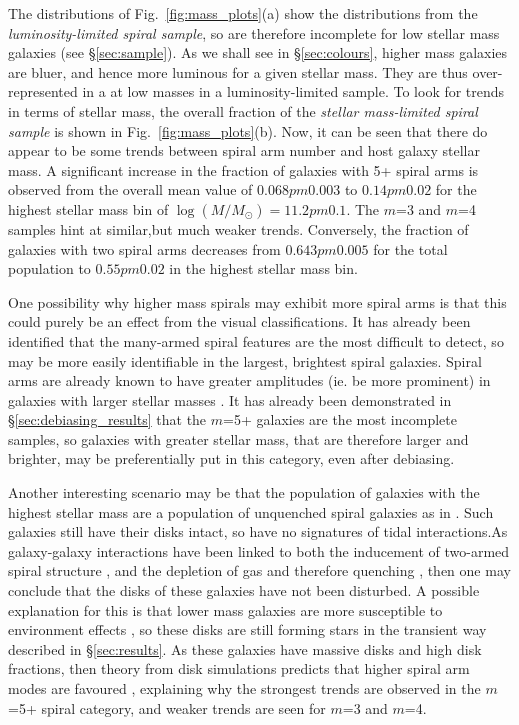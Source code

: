 \documentclass[useAMS,usenatbib]{mn2e}
\begin{document}
The distributions of Fig.~\ref{fig:mass_plots}(a) show the distributions from the \textit{luminosity-limited spiral sample}, so are therefore incomplete for low stellar mass galaxies (see \S\ref{sec:sample}). As we shall see in \S\ref{sec:colours}, higher mass galaxies are bluer, and hence more luminous for a given stellar mass. They are thus over-represented in a at low masses in a luminosity-limited sample. To look for trends in terms of stellar mass, the overall fraction of the \textit{stellar mass-limited spiral sample} is shown in Fig.~\ref{fig:mass_plots}(b). Now, it can be seen that there do appear to be some trends between spiral arm number and host galaxy stellar mass. A significant increase in the fraction of galaxies with 5+ spiral arms is observed from the overall mean value of $0.068 pm 0.003$ to $0.14 pm 0.02$ for the highest stellar mass bin of $\log(M/M_{\odot}) = 11.2 pm 0.1$. The $m$=3 and $m$=4 samples hint at similar,but much weaker trends. Conversely, the fraction of galaxies with two spiral arms decreases from $0.643 pm 0.005$ for the total population to $0.55 pm 0.02$ in the highest stellar mass bin. 

One possibility why higher mass spirals may exhibit more spiral arms is that this could purely be an effect from the visual classifications. It has already been  identified that the many-armed spiral features are the most difficult to detect, so  may be more easily identifiable in the largest, brightest spiral galaxies. Spiral arms are already known to have greater amplitudes (ie. be more prominent) in galaxies with larger stellar masses \citep{Kendall_15}. It has already been demonstrated in \S\ref{sec:debiasing_results} that the $m$=5+ galaxies are the most incomplete samples, so galaxies with greater stellar mass, that are therefore larger and brighter, may be preferentially put in this category, even after debiasing.

Another interesting scenario may be that the population of galaxies with the highest stellar mass are a population of unquenched spiral galaxies as in \citet{Ogle_16}. Such galaxies still have their disks intact, so have no signatures of tidal interactions.As galaxy-galaxy interactions have been linked to both the inducement of two-armed spiral structure \citep{Dobbs_10,Semczuk_15}, and the depletion of gas and therefore quenching \citep{Di_Matteo_07,Li_08}, then one may conclude that the disks of these galaxies have not been disturbed. A possible explanation for this is that lower mass galaxies are more susceptible to environment effects \citep{Bamford_09}, so these disks are still forming stars in the transient way described in \S\ref{sec:results}. As these galaxies have massive disks and high disk fractions, then theory from disk simulations predicts that higher spiral arm modes are favoured \citep{Donghia_15}, explaining why the strongest trends are observed in the $m$=5+ spiral category, and weaker trends are seen for $m$=3 and $m$=4.
\end{document}

